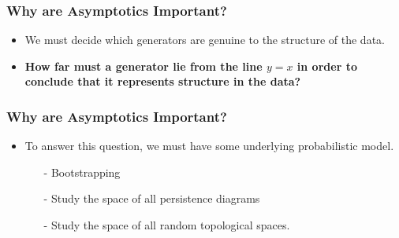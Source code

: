 \begin{frame}
\frametitle{Why are Asymptotics Important?}
\begin{itemize}
\item<1-> We must decide which generators are genuine to the structure of the data.
\item<2-> \textbf{How far must a generator lie from the line $y=x$ in order to conclude that it represents structure in the data?}
\end{itemize}
\begin{figure}
\end{figure}
\end{frame}

\begin{frame}
\frametitle{Why are Asymptotics Important?}
\begin{itemize}
\item To answer this question, we must have some underlying probabilistic model.
	\begin{itemize}
	\item[-] Bootstrapping
	\item[-] Study the space of all persistence diagrams
	\item[-] Study the space of all random topological spaces.
	\end{itemize}
\end{itemize}
\end{frame}